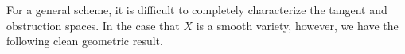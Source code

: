 \documentclass[11pt]{amsart}
\def\Spec{{\rm Spec}}
\begin{document}
%
%
%

For a general scheme, it is difficult to completely characterize the tangent and obstruction spaces. 
In the case that $X$ is a smooth variety, however, we have the following clean geometric result.
\end{document}
